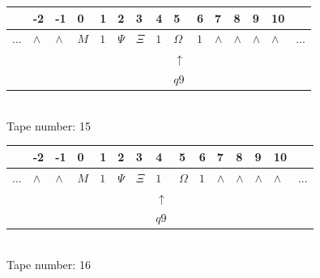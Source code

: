 \documentclass[11pt]{article}
\begin{document}
\begin{table}[H]
\centering
\begin{tabular}{lllllllllllllll}
 & -2 & -1 & 0 & 1 & 2 & 3 & 4 & 5 & 6 & 7 & 8 & 9 & 10 & \\
\hline
$...$ & \multicolumn{1}{|l|}{$\wedge$} & \multicolumn{1}{|l|}{$\wedge$} & \multicolumn{1}{|l|}{$M$} & \multicolumn{1}{|l|}{$1$} & \multicolumn{1}{|l|}{$\Psi$} & \multicolumn{1}{|l|}{$\Xi$} & \multicolumn{1}{|l|}{$1$} & \multicolumn{1}{|l|}{$\Omega$} & \multicolumn{1}{|l|}{$1$} & \multicolumn{1}{|l|}{$\wedge$} & \multicolumn{1}{|l|}{$\wedge$} & \multicolumn{1}{|l|}{$\wedge$} & \multicolumn{1}{|l|}{$\wedge$} & $...$\\
\hline
&  &  &  &  &  &  &  & $\uparrow$ &  &  &  &  &  &  \\
&  &  &  &  &  &  &  & $ q9 $ &  &  &  &  &  &  \\
\end{tabular}
\\
Tape number: 15
\noindent\makebox[\linewidth]{\hdashrule{\textwidth}{1pt}{1pt}}\end{table}

\begin{table}[H]
\centering
\begin{tabular}{lllllllllllllll}
 & -2 & -1 & 0 & 1 & 2 & 3 & 4 & 5 & 6 & 7 & 8 & 9 & 10 & \\
\hline
$...$ & \multicolumn{1}{|l|}{$\wedge$} & \multicolumn{1}{|l|}{$\wedge$} & \multicolumn{1}{|l|}{$M$} & \multicolumn{1}{|l|}{$1$} & \multicolumn{1}{|l|}{$\Psi$} & \multicolumn{1}{|l|}{$\Xi$} & \multicolumn{1}{|l|}{$1$} & \multicolumn{1}{|l|}{$\Omega$} & \multicolumn{1}{|l|}{$1$} & \multicolumn{1}{|l|}{$\wedge$} & \multicolumn{1}{|l|}{$\wedge$} & \multicolumn{1}{|l|}{$\wedge$} & \multicolumn{1}{|l|}{$\wedge$} & $...$\\
\hline
&  &  &  &  &  &  & $\uparrow$ &  &  &  &  &  &  &  \\
&  &  &  &  &  &  & $ q9 $ &  &  &  &  &  &  &  \\
\end{tabular}
\\
Tape number: 16
\noindent\makebox[\linewidth]{\hdashrule{\textwidth}{1pt}{1pt}}\end{table}
\end{document}
